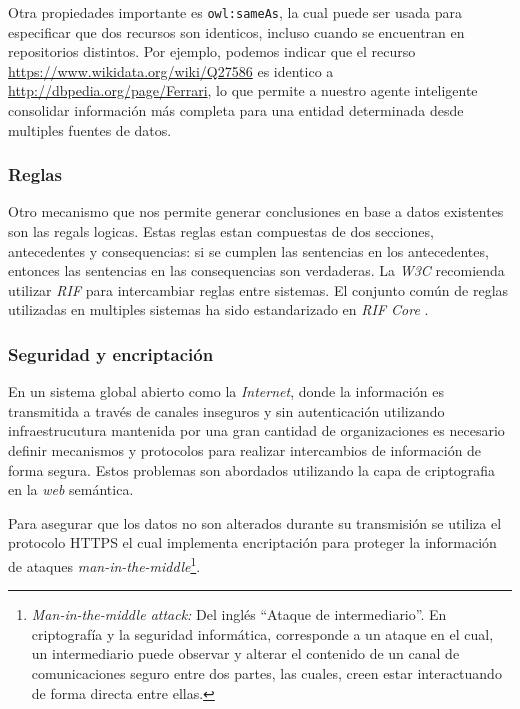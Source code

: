 Otra propiedades importante es \texttt{owl:sameAs}, la cual puede ser usada para
especificar que dos recursos son identicos, incluso cuando se encuentran en
repositorios distintos. Por ejemplo, podemos indicar que el recurso
\url{https://www.wikidata.org/wiki/Q27586} es identico a
\url{http://dbpedia.org/page/Ferrari}, lo que permite a nuestro agente
inteligente consolidar información más completa para una entidad determinada
desde multiples fuentes de datos.

\subsubsection{Reglas}

Otro mecanismo que nos permite generar conclusiones en base a datos existentes
son las regals logicas. Estas reglas estan compuestas de dos secciones,
antecedentes y consequencias: si se cumplen las sentencias en los antecedentes,
entonces las sentencias en las consequencias son verdaderas. La \textit{W3C}
recomienda utilizar \textit{RIF} \cite{kifer2013rif} para intercambiar reglas
entre sistemas. El conjunto común de reglas utilizadas en multiples sistemas ha
sido estandarizado en \textit{RIF Core} \cite{boley2010rif}.

\subsubsection{Seguridad y encriptación}

En un sistema global abierto como la \textit{Internet}, donde la información es
transmitida a través de canales inseguros y sin autenticación utilizando
infraestrucutura mantenida por una gran cantidad de organizaciones es necesario
definir mecanismos y protocolos para realizar intercambios de información de
forma segura. Estos problemas son abordados utilizando la capa de criptografia
en la \textit{web} semántica.

Para asegurar que los datos no son alterados durante su transmisión se utiliza
el protocolo HTTPS \cite{rescorla2000rfc2818} el cual implementa encriptación
para proteger la información de ataques
\textit{man-in-the-middle}\footnote{\textit{Man-in-the-middle attack:} Del
inglés ``Ataque de intermediario''. En criptografía y la seguridad informática,
corresponde a un ataque en el cual, un intermediario puede observar y alterar el
contenido de un canal de comunicaciones seguro entre dos partes, las cuales,
creen estar interactuando de forma directa entre ellas.}.

